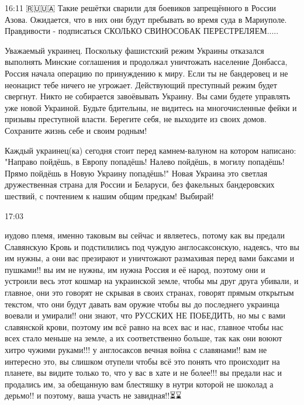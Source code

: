 16:11
🇷🇺🇺🇦 Такие решётки сварили для боевиков запрещённого в России Азова. Ожидается, что в них они будут пребывать во время суда в Мариуполе.
Правдивости - подписаться
СКОЛЬКО СВИНОСОБАК ПЕРЕСТРЕЛЯЕМ.....


Уважаемый украинец. Поскольку фашистский режим Украины отказался выполнять
Минские соглашения и продолжал уничтожать население Донбасса, Россия начала
операцию по принуждению к миру. Если ты не бандеровец и не неонацист тебе
ничего не угрожает. Действующий преступный режим будет свергнут. Никто не
собирается завоёвывать Украину. Вы сами будете управлять уже новой Украиной.
Будьте бдительны, не видитесь на многочисленные фейки и призывы преступной
власти. Берегите себя, не выходите из своих домов. Сохраните жизнь себе и своим
родным!


Каждый украинец(ка) сегодня стоит перед камнем-валуном на котором написано:
"Направо пойдёшь, в Европу попадёшь! Налево пойдёшь, в могилу попадёшь! Прямо
пойдёшь в Новую Украину попадёшь!" Новая Украина это светлая дружественная
страна для России и Беларуси, без факельных бандеровских шествий, с почтением к
нашим общим предкам! Выбирай!

17:03

иудово племя, именно таковым вы сейчас и являетесь, потому как вы предали
Славянскую Кровь и подстилились под чуждую  англосаксонскую, надеясь, что вы им
нужны, а они вас презирают и уничтожают размахивая перед вами баксами и
пушками!! вы им не нужны, им нужна Россия и её народ, поэтому они и устроили
весь этот кошмар на украинской земле, чтобы мы друг друга убивали, и главное,
они это говорят не скрывая в своих странах, говорят  прямым открытым текстом,
что они будут давать вам оружие чтобы вы до последнего украинца воевали и
умирали!! они знают, что РУССКИХ НЕ ПОБЕДИТЬ, но мы с вами славянской крови,
поэтому им всё равно на всех вас и нас, главное чтобы нас всех стало меньше на
земле, а их соответственно больше, так как они воюют хитро чужими руками!!! у
англосаксов вечная война с славянами!! вам не интересно это, вы слишком отупели
чтобы всё это понять что происходит на планете, вы видите только то, что у вас
в хате и не более!!! вы предали нас и  продались им, за обещанную вам
блестяшку  в нутри которой не шоколад а дерьмо!! и поэтому,  ваша участь не
завидная!!⏳⌛


